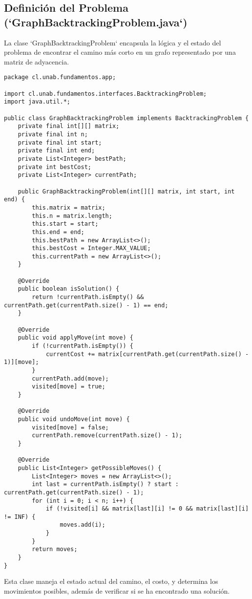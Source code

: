 \documentclass[12pt]{article}
\begin{document}
\subsection*{Definición del Problema (`GraphBacktrackingProblem.java`)}
La clase `GraphBacktrackingProblem` encapsula la lógica y el estado del problema de encontrar el camino más corto en un grafo representado por una matriz de adyacencia.

\begin{lstlisting}[caption={Fragmento de `GraphBacktrackingProblem.java`}, morekeywords={Override}]
package cl.unab.fundamentos.app;

import cl.unab.fundamentos.interfaces.BacktrackingProblem;
import java.util.*;

public class GraphBacktrackingProblem implements BacktrackingProblem {
    private final int[][] matrix;
    private final int n;
    private final int start;
    private final int end;
    private List<Integer> bestPath;
    private int bestCost;
    private List<Integer> currentPath;

    public GraphBacktrackingProblem(int[][] matrix, int start, int end) {
        this.matrix = matrix;
        this.n = matrix.length;
        this.start = start;
        this.end = end;
        this.bestPath = new ArrayList<>();
        this.bestCost = Integer.MAX_VALUE;
        this.currentPath = new ArrayList<>();
    }

    @Override
    public boolean isSolution() {
        return !currentPath.isEmpty() && currentPath.get(currentPath.size() - 1) == end;
    }

    @Override
    public void applyMove(int move) {
        if (!currentPath.isEmpty()) {
            currentCost += matrix[currentPath.get(currentPath.size() - 1)][move];
        }
        currentPath.add(move);
        visited[move] = true;
    }

    @Override
    public void undoMove(int move) {
        visited[move] = false;
        currentPath.remove(currentPath.size() - 1);
    }

    @Override
    public List<Integer> getPossibleMoves() {
        List<Integer> moves = new ArrayList<>();
        int last = currentPath.isEmpty() ? start : currentPath.get(currentPath.size() - 1);
        for (int i = 0; i < n; i++) {
            if (!visited[i] && matrix[last][i] != 0 && matrix[last][i] != INF) {
                moves.add(i);
            }
        }
        return moves;
    }
}
\end{lstlisting}
Esta clase maneja el estado actual del camino, el costo, y determina los movimientos posibles, además de verificar si se ha encontrado una solución.
\end{document}

